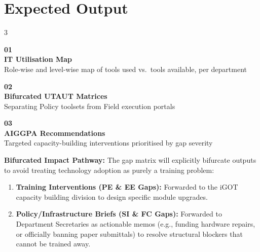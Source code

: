\documentclass[11pt,a4paper]{article}
\begin{document}
\section{Expected Output}

\vspace{0.2cm}
\begin{multicols}{3}

\begin{tcolorbox}[colback=navyblue,colframe=navyblue,arc=4mm,
  left=8pt,right=8pt,top=8pt,bottom=8pt]
\centering
{\color{gold}\bfseries\large 01}\\[4pt]
{\color{white}\small\textbf{IT Utilisation Map}\\[4pt]
Role-wise and level-wise map of tools used vs.\ tools available, per department}
\end{tcolorbox}

\columnbreak

\begin{tcolorbox}[colback=accentteal,colframe=accentteal,arc=4mm,
  left=8pt,right=8pt,top=8pt,bottom=8pt]
\centering
{\color{white}\bfseries\large 02}\\[4pt]
{\color{white}\small\textbf{Bifurcated UTAUT Matrices}\\[4pt]
Separating Policy toolsets from Field execution portals}
\end{tcolorbox}

\columnbreak

\begin{tcolorbox}[colback=gold,colframe=gold,arc=4mm,
  left=8pt,right=8pt,top=8pt,bottom=8pt]
\centering
{\color{navyblue}\bfseries\large 03}\\[4pt]
{\color{navyblue}\small\textbf{AIGGPA Recommendations}\\[4pt]
Targeted capacity-building interventions prioritised by gap severity}
\end{tcolorbox}

\end{multicols}

\vspace{0.4cm}
\begin{greenbox}
\textbf{\color{darkgreen}Bifurcated Impact Pathway:} The gap matrix will explicitly bifurcate outputs to avoid treating technology adoption as purely a training problem:
\begin{enumerate}[label=\textcolor{darkgreen}{\bfseries\arabic*.},itemsep=2pt,leftmargin=1.5em]
  \item \textbf{Training Interventions (PE \& EE Gaps):} Forwarded to the iGOT capacity building division to design specific module upgrades.
  \item \textbf{Policy/Infrastructure Briefs (SI \& FC Gaps):} Forwarded to Department Secretaries as actionable memos (e.g., funding hardware repairs, or officially banning paper submittals) to resolve structural blockers that cannot be trained away.
\end{enumerate}
\end{greenbox}
\end{document}
